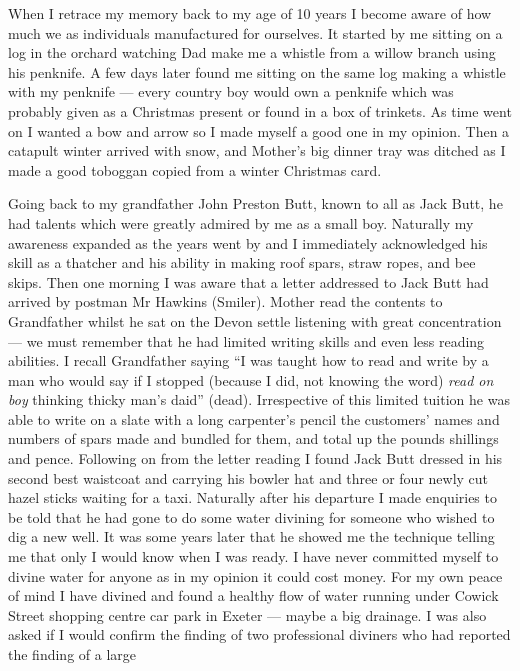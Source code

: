 
When I retrace my memory back to my age of 10 years I become aware of how much
we as individuals manufactured for ourselves. It started by me sitting on a log
in the orchard watching Dad make me a whistle from a willow branch using his
penknife. A few days later found me sitting on the same log making a whistle
with my penknife --- every country boy would own a penknife which was probably
given as a Christmas present or found in a box of trinkets. As time went on I
wanted a bow and arrow so I made myself a good one in my opinion. Then a
catapult winter arrived with snow, and Mother's big dinner tray was ditched as
I made a good toboggan copied from a winter Christmas card.

Going back to my grandfather John Preston Butt, known to all as Jack Butt, he
had talents which were greatly admired by me as a small boy. Naturally my
awareness expanded as the years went by and I immediately acknowledged his
skill as a thatcher and his ability in making roof spars, straw ropes, and bee
skips. Then one morning I was aware that a letter addressed to Jack Butt had
arrived by postman Mr Hawkins (Smiler). Mother read the contents to Grandfather
whilst he sat on the Devon settle listening with great concentration --- we
must remember that he had limited writing skills and even less reading
abilities. I recall Grandfather saying ``I was taught how to read and write by
a man who would say if I stopped (because I did, not knowing the word)
\emph{read on boy} thinking thicky man's daid'' (dead). Irrespective of this
limited tuition he was able to write on a slate with a long carpenter's pencil
the customers' names and numbers of spars made and bundled for them, and total
up the pounds shillings and pence. Following on from the letter reading I
found Jack Butt dressed in his second best waistcoat and carrying his bowler
hat and three or four newly cut hazel sticks waiting for a taxi. Naturally
after his departure I made enquiries to be told that he had gone to do some
water divining for someone who wished to dig a new well. It was some years
later that he showed me the technique telling me that only I would know when I
was ready. I have never committed myself to divine water for anyone as in my
opinion it could cost money. For my own peace of mind I have divined and found
a healthy flow of water running under Cowick Street shopping centre car park
in Exeter --- maybe a big drainage. I was also asked if I would confirm the
finding of two professional diviners who had reported the finding of a large
